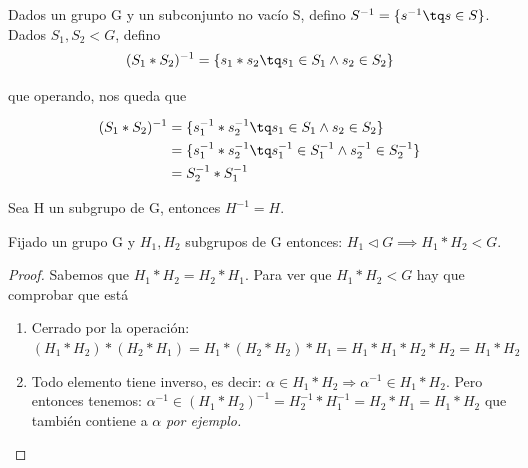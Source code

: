 \documentclass[a4paper,10pt]{apuntes}
\begin{document}
 Dados un grupo G y un subconjunto no vacío S, defino $S^{-1}=\{s^{-1}\tq s\in S\}$. Dados $S_{1},S_{2}<G$, defino  \[ (S_{1}\ast S_{2})^{-1}=\{s_{1}\ast s_{2}\tq s_{1}\in S_{1} \wedge s_{2}\in S_{2}\} \]
 
 que operando, nos queda que 
 
 \begin{align*}
 (S_1 \ast S_2)^{-1} &= \{s_{1}^{-1}\ast s_{2}^{-1}\tq s_{1}\in S_{1} \wedge s_{2}\in S_{2}\}\\
 &= \{s_{1}^{-1}\ast s_{2}^{-1}\tq s_{1}^{-1}\in S_{1}^{-1} \wedge s_{2}^{-1}\in S_{2}^{-1}\} \\
 & =S_{2}^{-1}\ast S_{1}^{-1}
 \end{align*}
 
 Sea H un subgrupo de G, entonces $H^{-1}=H$.
 
 \begin{theorem}
  Fijado un grupo G y $H_{1}, H_{2}$  subgrupos de G entonces: $H_{1} \lhd G \implies H_{1}\ast H_{2}<G$. 
 \end{theorem}
 
 \begin{proof}
  Sabemos que $H_{1}\ast H_{2}=H_{2}\ast H_{1}$. Para ver que $H_{1}\ast H_{2}<G$  hay que comprobar que está
  \begin{enumerate}
   \item Cerrado por la operación: $(H_{1}\ast H_{2})\ast (H_{2}\ast H_{1})=H_{1}\ast (H_{2}\ast H_{2})\ast H_{1}=H_{1}\ast H_{1}\ast H_{2}\ast H_{2}=H_{1}\ast H_{2}$
   \item Todo elemento tiene inverso, es decir: $\alpha\in H_{1}\ast H_{2}\Rightarrow \alpha^{-1}\in H_{1}\ast H_{2}$. Pero entonces tenemos:
   $\alpha^{-1}\in (H_{1}\ast H_{2})^{-1} = H_{2}^{-1}\ast H_{1}^{-1}=H_{2}\ast H_{1}=H_{1}\ast H_{2}$ que también contiene a $\alpha$ \textit{por ejemplo.}
  \end{enumerate}
 \end{proof}
\end{document}
